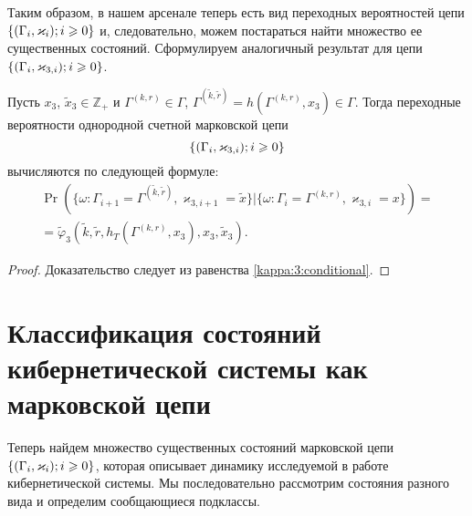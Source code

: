 Таким образом,  в нашем арсенале теперь есть вид переходных вероятностей цепи $\Mark$ и,  следовательно,  можем постараться найти множество ее существенных состояний. Сформулируем аналогичный результат для цепи $\MarkThree$.
\begin{theorem}
Пусть $x_3$,  $\tilde{x}_3\in \mathbb{Z}_+$ и $\Gamma^{(k, r)}\in \Gamma$,  $\Gamma^{(\tilde{k}, \tilde{r})}=h(\Gamma^{(k, r)}, x_3) \in \Gamma$. Тогда переходные вероятности однородной счетной марковской цепи $$
\MarkThree
$$
вычисляются по следующей формуле:
\begin{multline}
\Pr (\{\omega\colon\Gamma_{i+1}=\Gamma^{(\tilde{k}, \tilde{r})}, \varkappa_{3, i+1}=\tilde{x}\}|\{\omega\colon\Gamma_{i}=\Gamma^{(k, r)}, \varkappa_{3, i}=x\}) 
= \\ =\widetilde{\varphi}_3(\tilde{k}, \tilde{r}, h_T(\Gamma^{(k, r)}, x_3), x_3, \tilde{x}_3).
\label{transitionToProve:three}
\end{multline}
\end{theorem}
\begin{proof}
Доказательство следует из равенства \eqref{kappa:3:conditional}.
\end{proof}


\section[Классификация состояний кибернетической системы как марковской цепи]%
{Классификация состояний кибернетической системы как марковской цепи}
Теперь найдем множество существенных состояний марковской цепи $\Mark$,  которая описывает динамику исследуемой в работе кибернетической системы. Мы последовательно рассмотрим состояния разного вида и определим сообщающиеся подклассы. 

